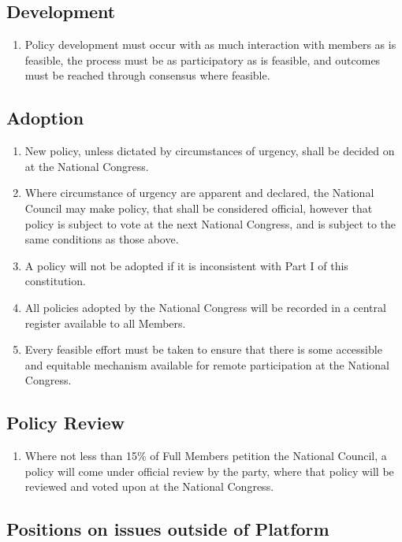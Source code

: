 \documentclass[a4paper,titlepage,8.5pt]{article}
\begin{document}
\subsection{Development}

\begin{enumerate}
\item Policy development must occur with as much interaction with members as is feasible, the process must be as participatory as is feasible, and outcomes must be reached through consensus where feasible.
\end{enumerate}

\subsection{Adoption}

\begin{enumerate}
\item New policy, unless dictated by circumstances of urgency, shall be decided on at the National Congress.
\item Where circumstance of urgency are apparent and declared, the National Council may make policy, that shall be considered official, however that policy is subject to vote at the next National Congress, and is subject to the same conditions as those above.
\item A policy will not be adopted if it is inconsistent with Part I of this constitution.
\item All policies adopted by the National Congress will be recorded in a central register available to all Members.
\item Every feasible effort must be taken to ensure that there is some accessible and equitable mechanism available for remote participation at the National Congress.
\end{enumerate}

\subsection{Policy Review}

\begin{enumerate}
\item Where not less than 15\% of Full Members petition the National Council, a policy will come under official review by the party, where that policy will be reviewed and voted upon at the National Congress.
\end{enumerate}

\subsection{Positions on issues outside of Platform}
\end{document}
